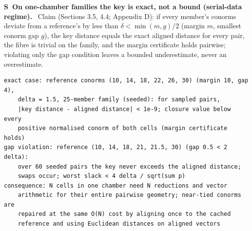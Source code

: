\documentclass[11pt]{article}
\newcounter{scheck}
\renewcommand{\thescheck}{S\arabic{scheck}}
\newcommand{\sitem}[2]{\medskip\noindent\refstepcounter{scheck}\label{#1}\textbf{\thescheck\ #2.}\ }
\begin{document}
\sitem{z:isometry}{On one-chamber families the key is exact, not a bound (serial-data regime)}
Claim (Sections 3.5, 4.4; Appendix D): if every member's conorms deviate from a reference's by less than $\delta < \min(m,g)/2$ (margin $m$, smallest conorm gap $g$), the key distance equals the exact aligned distance for every pair, the fibre is trivial on the family, and the margin certificate holds pairwise; violating only the gap condition leaves a bounded underestimate, never an overestimate.
\begin{footnotesize}\begin{verbatim}
exact case: reference conorms (10, 14, 18, 22, 26, 30) (margin 10, gap 4),
    delta = 1.5, 25-member family (seeded): for sampled pairs,
    |key distance - aligned distance| < 1e-9; closure value below every
    positive normalised conorm of both cells (margin certificate holds)
gap violation: reference (10, 14, 18, 21, 21.5, 30) (gap 0.5 < 2 delta):
    over 60 seeded pairs the key never exceeds the aligned distance;
    swaps occur; worst slack < 4 delta / sqrt(sum p)
consequence: N cells in one chamber need N reductions and vector
    arithmetic for their entire pairwise geometry; near-tied conorms are
    repaired at the same O(N) cost by aligning once to the cached
    reference and using Euclidean distances on aligned vectors
\end{verbatim}\end{footnotesize}
\end{document}
